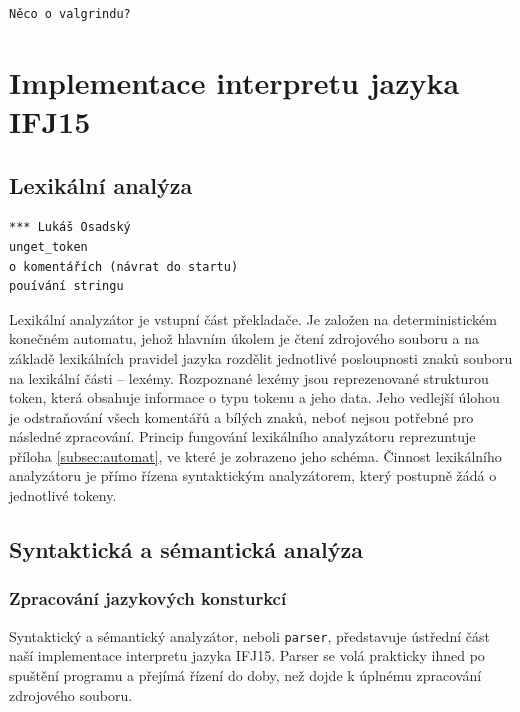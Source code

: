 \documentclass[a4paper, 12pt]{article}
\begin{document}
\begin{verbatim}
Něco o valgrindu?
\end{verbatim}

\newpage

\section{Implementace interpretu jazyka IFJ15} \label{implementace}
\subsection{Lexikální analýza} \label{lexer}

\begin{verbatim}
*** Lukáš Osadský
unget_token
o komentářích (návrat do startu)
pouívání stringu
\end{verbatim}
Lexikální analyzátor je vstupní část překladače. Je založen na deterministickém
konečném automatu, jehož hlavním úkolem je čtení zdrojového souboru a na základě
lexikálních pravidel jazyka rozdělit jednotlivé posloupnosti znaků
souboru na lexikální části  -- lexémy. Rozpoznané lexémy jsou reprezenované
strukturou token, která obsahuje informace o typu
tokenu a jeho data. Jeho vedlejší úlohou je odstraňování všech komentářů
a bílých znaků, neboť nejsou potřebné pro
následné zpracování. Princip fungování lexikálního analyzátoru reprezuntuje
příloha \ref{subsec:automat}, ve které je zobrazeno jeho schéma.
Činnost lexikálního analyzátoru je přímo řízena syntaktickým analyzátorem,
který postupně žádá o jednotlivé tokeny.

\subsection{Syntaktická a sémantická analýza} \label{parser}

\subsubsection{Zpracování jazykových konsturkcí}
Syntaktický a sémantický analyzátor, neboli \texttt{parser}, představuje ústřední
část naší implementace interpretu jazyka IFJ15. Parser se volá prakticky ihned po
spuštění programu a přejímá řízení do doby, než dojde k úplnému zpracování
zdrojového souboru.
\end{document}
